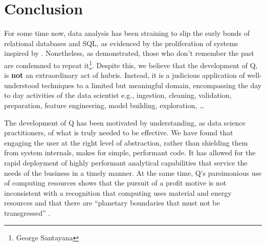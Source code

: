 \section{Conclusion}
\label{end}

For some time now, data analysis has been straining to 
slip the surly bonds of relational databases and SQL, as evidenced by the proliferation of systems
inspired by \cite{mapreduce2004}. Nonetheless, as \cite{antihadoop2009}
demonstrated,
those who don't remember the past are condemned to repeat it\footnote{George
Santayana}. Despite this, we believe that the development of Q, is {\bf not} an
    extraordinary act of hubris. Instead, it is a judicious application of
    well-understood techniques to a limited but meaningful domain, encompassing
    the day to day activities of the data scientist e.g., ingestion, cleaning,
    validation, preparation, feature engineering, model building, exploration,
    \ldots

The development of Q has been motivated by understanding, as data 
science practitioners, of what is truly needed to be
effective. We have found that engaging the user at the right level of abstraction, rather than shielding them from
system internals, makes for simple, performant code. It has allowed for the
rapid deployment of highly performant analytical capabilities that 
service the needs of the business in a timely manner. At the same time, Q's
parsimonious use of computing resources shows that the pursuit of a profit
motive is not inconsistent with a recognition that computing uses 
material and energy resources \cite{Schumacher,Limits2018} and that there are 
``planetary boundaries that must not be transgressed'' \cite{Rockstrom2009}.

